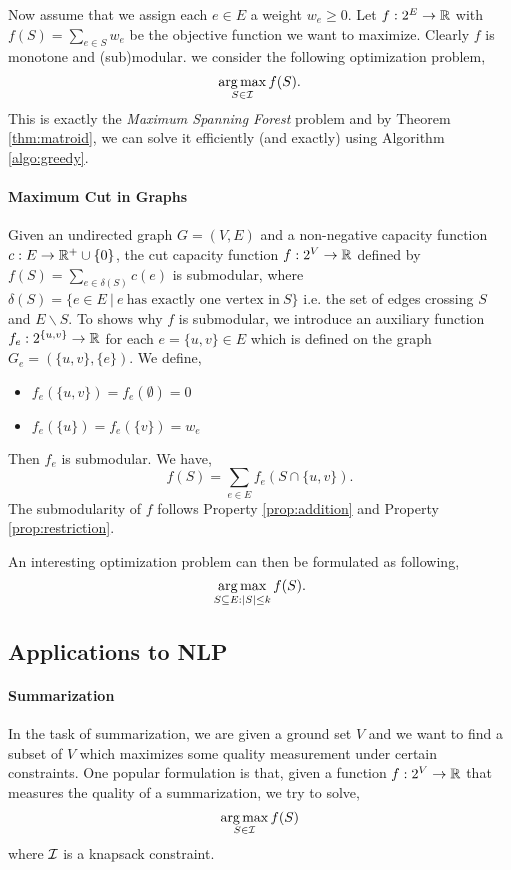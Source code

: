 Now assume that we assign each $e\in E$ a weight $w_e \geq 0$. Let $f: 2^E\rightarrow \mathbb{R}$ with $f(S) = \sum_{e\in S}w_e$ be the objective function we want to maximize. Clearly $f$ is monotone and (sub)modular. we consider the following optimization problem,
$$\operatorname*{arg\,max}_{S \in \mathcal{I}} f(S).$$
This is exactly the \emph{Maximum Spanning Forest} problem and by Theorem \ref{thm:matroid}, we can solve it efficiently (and exactly) using Algorithm \ref{algo:greedy}.


\paragraph{Maximum Cut in Graphs}
Given an undirected graph $G = (V, E)$ and a non-negative capacity function $c: E \rightarrow \mathbb{R}^+\cup\{0\}$, the cut capacity function $f:2^V \rightarrow \mathbb{R}$ defined by $f(S) = \sum_{e\in \delta(S)} c(e)$ is submodular, where $\delta(S) = \{e\in E~|~e~\text{has exactly one vertex in}~S\}$ i.e. the set of edges crossing $S$ and $E\backslash S$. To shows why $f$ is submodular, we introduce an auxiliary function $f_e: 2^{\{u, v\}} \rightarrow \mathbb{R}$ for each $e = \{u, v\}\in E$ which is defined on the graph $G_e = (\{u,v\}, \{e\})$. We define, 
\begin{itemize}
\item $f_e(\{u, v\}) = f_e(\emptyset) = 0$
\item $f_e(\{u\}) = f_e(\{v\}) = w_e$
\end{itemize}
Then $f_e$ is submodular. We have,
$$f(S) = \sum_{e\in E} f_e(S \cap \{u, v\}).$$
The submodularity of $f$ follows Property \ref{prop:addition} and Property \ref{prop:restriction}.

An interesting optimization problem can then be formulated as following,
$$\operatorname*{arg\,max}_{S\subseteq E: |S| \leq k} f(S).$$





\subsection{Applications to NLP}
\paragraph{Summarization}
In the task of summarization, we are given a ground set $V$ and we want to find a subset of $V$ which maximizes some quality measurement under certain constraints. One popular formulation is that, given a function $f: 2^V \rightarrow \mathbb{R}$ that measures the quality of a summarization, we try to solve,
$$\operatorname*{arg\,max}_{S\in\mathcal{I}} f(S)$$
where $\mathcal{I}$ is a knapsack constraint.

